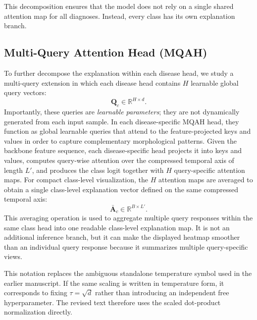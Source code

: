 \documentclass[11pt]{article}
\begin{document}
This decomposition ensures that the model does not rely on a single shared attention map for all diagnoses. Instead, every class has its own explanation branch.

\subsection{Multi-Query Attention Head (MQAH)}

To further decompose the explanation within each disease head, we study a multi-query extension in which each disease head contains $H$ learnable global query vectors:
\[
\mathbf{Q}_c \in \mathbb{R}^{H \times d}.
\]
Importantly, these queries are \emph{learnable parameters}; they are not dynamically generated from each input sample. In each disease-specific MQAH head, they function as global learnable queries that attend to the feature-projected keys and values in order to capture complementary morphological patterns. Given the backbone feature sequence, each disease-specific head projects it into keys and values, computes query-wise attention over the compressed temporal axis of length $L'$, and produces the class logit together with $H$ query-specific attention maps. For compact class-level visualization, the $H$ attention maps are averaged to obtain a single class-level explanation vector defined on the same compressed temporal axis:
\[
\bar{\mathbf{A}}_c \in \mathbb{R}^{B \times L'}.
\]
This averaging operation is used to aggregate multiple query responses within the same class head into one readable class-level explanation map. It is not an additional inference branch, but it can make the displayed heatmap smoother than an individual query response because it summarizes multiple query-specific views.

This notation replaces the ambiguous standalone temperature symbol used in the earlier manuscript. If the same scaling is written in temperature form, it corresponds to fixing $\tau=\sqrt{d}$ rather than introducing an independent free hyperparameter. The revised text therefore uses the scaled dot-product normalization directly.
\end{document}
